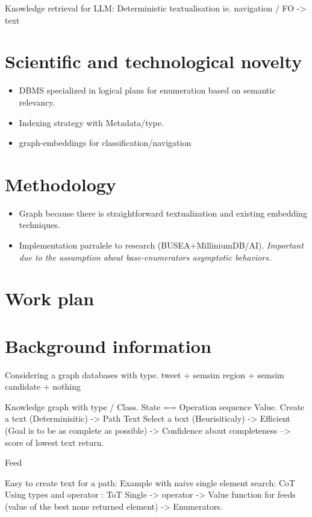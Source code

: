 \documentclass[10pt]{article}
\theoremstyle{definition}
\begin{document}
Knowledge retrieval for LLM:
    Deterministic textualisation ie. navigation / FO -> text 



\section{Scientific and technological novelty}

\begin{itemize}
    \item DBMS specialized in logical plans for enumeration based on semantic relevancy.
    \item Indexing strategy with Metadata/type.
    \item graph-embeddings for classification/navigation
\end{itemize}

\section{Methodology}
\begin{itemize}
    \item Graph because there is straightforward textualization and existing embedding techniques.
    \item Implementation parralele to research (BUSEA+MilliniumDB/AI). \textit{Important due to the assumption about base-enumerators asymptotic behaviors.}
\end{itemize}



\section{Work plan}
\section{Background information}



Considering a graph databases with type.
tweet + semsim 
region + semsim 
candidate + nothing  

Knowledge graph with type / Class. 
State == Operation sequence Value. 
Create a text (Determinisitic) -> Path Text
Select a text (Heurisiticaly)  -> Efficient (Goal is to be as complete as possible)
    -> Confidence about completeness --> score of lowest text return.



Feed


Easy to create text for a path: Example with naive single element search: CoT
Using types and operator : ToT 
Single -> operator -> 
Value function for feeds (value of the best none returned element) -> Enumerators. 
\end{document}
